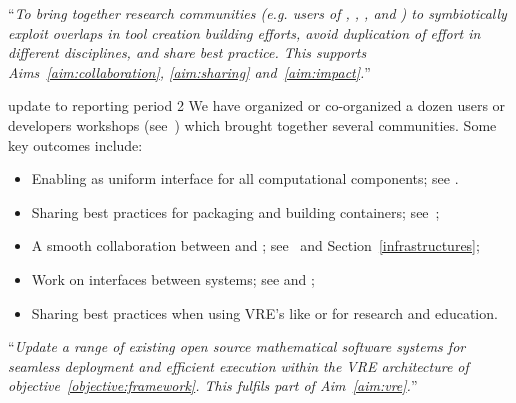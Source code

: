 \begin{compactenum}[\bf O1\rm:]
\item \label{objective:community} ``\emph{To bring together research
  communities (e.g. users of \Jupyter, \Sage, \Singular, and \GAP) to
  symbiotically exploit overlaps in tool creation building efforts,
  avoid duplication of effort in different disciplines, and share best
  practice. This supports Aims~\ref{aim:collaboration},
  \ref{aim:sharing} and~\ref{aim:impact}.}''

\begin{oldpart}{update to reporting period 2}
  We have organized or co-organized a dozen users or developers
  workshops (see~) which brought
  together several communities. Some key outcomes include:
  \begin{itemize}
  \item Enabling \Jupyter as uniform interface for all computational
    components; see .
  \item Sharing best practices for packaging and building
    containers;
    see~;
  \item A smooth collaboration between \JupyterHub and \SMC;
    see~ and
    Section~\ref{infrastructures};
  \item Work on interfaces between systems; see
     and
    ;
  \item Sharing best practices when using VRE's like \cocalc or \Jupyter
    for research and education.
  \end{itemize}
\end{oldpart}

\item \label{objective:updates} ``\emph{Update a range of existing open source
  mathematical software systems for seamless deployment and efficient
  execution within the VRE architecture of objective~\ref{objective:framework}.
  This fulfils part of Aim~\ref{aim:vre}.}''


\end{compactenum}
